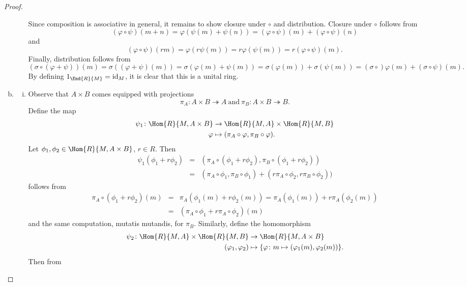 \documentclass[10pt]{amsart}
\begin{document}
\begin{thm}
\begin{proof}
\begin{enumerate}[(a)]
\begin{enumerate}[(i)]
    Since composition is associative in general, it remains to show closure under $\circ$ and distribution.
    Closure under $\circ$ follows from
    $$(\varphi \circ \psi)(m + n) = \varphi(\psi(m) + \psi(n)) = (\varphi\circ\psi)(m) + (\varphi\circ\psi)(n)$$
    and
    $$(\varphi \circ \psi)(rm) = \varphi(r\psi(m)) = r\varphi(\psi(m)) = r(\varphi\circ\psi)(m).$$
    Finally, distribution follows from 
    $$(\sigma \circ (\varphi + \psi))(m) = \sigma((\varphi+ \psi)(m)) = \sigma(\varphi(m) + \psi(m)) = \sigma(\varphi(m)) + \sigma(\psi(m)) = (\sigma\circ)\varphi(m) + (\sigma\circ\psi)(m).$$
    By defining $1_{\End{R}{M}} = \operatorname{id}_M$, it is clear that this is a unital ring.
\end{enumerate}
\item
\begin{enumerate}[(ii)]
\item
  Observe that $A \times B$ comes equipped with projections 
  $$\pi_A \colon A \times B \twoheadrightarrow A\ \text{and}\ \pi_B \colon A \times B \twoheadrightarrow B.$$
  Define the map
  \begin{align*}
    \psi_1 \colon \Hom{R}{M, A \times B} &\rightarrow \Hom{R}{M, A} \times \Hom{R}{M,B}\\
    \varphi &\mapsto (\pi_A \circ \varphi, \pi_B \circ \varphi).
  \end{align*}
  Let $\phi_1, \phi_2 \in \Hom{R}{M, A \times B}$, $r \in R$.
  Then 
  \begin{eqnarray*}
    \psi_1(\phi_1 + r\phi_2) &=& (\pi_A \circ (\phi_1 + r\phi_2), \pi_B \circ (\phi_1 + r\phi_2))\\
    &=& (\pi_A \circ \phi_1, \pi_B \circ \phi_1) + (r \pi_A \circ \phi_2, r \pi_B \circ \phi_2))
  \end{eqnarray*}
  follows from 
  \begin{eqnarray*}
    \pi_A \circ (\phi_1 + r\phi_2)(m) &=& \pi_A(\phi_1(m) + r\phi_2(m)) = \pi_A(\phi_1(m)) + r\pi_A(\phi_2(m))\\
    &=& (\pi_A\circ \phi_1 + r\pi_A \circ \phi_2)(m)
  \end{eqnarray*}and the same computation, mutatis mutandis, for $\pi_B$.
  Similarly, define the homomorphism
  \begin{align*}
    \psi_2 \colon \Hom{R}{M, A} \times \Hom{R}{M,B} &\rightarrow \Hom{R}{M, A \times B}\\
    (\varphi_1, \varphi_2) &\mapsto \{\varphi \colon m \mapsto (\varphi_1(m), \varphi_2(m))\}.
  \end{align*}
  Then from

\end{enumerate}
\end{enumerate}
\end{proof}
\end{thm}
\end{document}
